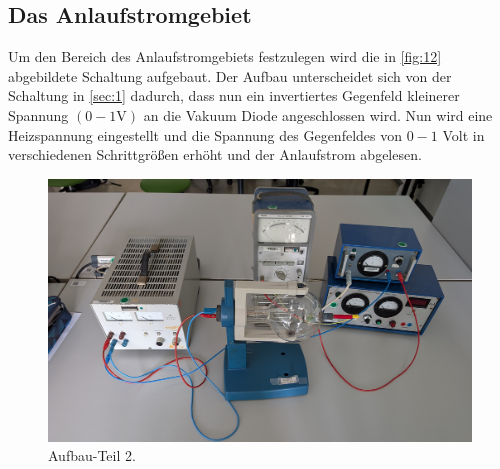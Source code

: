 \subsection{Das Anlaufstromgebiet}
Um den Bereich des Anlaufstromgebiets festzulegen wird die in \autoref{fig:12}
abgebildete Schaltung aufgebaut. Der Aufbau unterscheidet sich von der Schaltung
in \autoref{sec:1} dadurch, dass nun ein invertiertes Gegenfeld kleinerer Spannung
$\left(0 - 1 \unit{\volt}\right)$ an die Vakuum Diode angeschlossen wird.
Nun wird eine Heizspannung eingestellt und die Spannung des Gegenfeldes
von $0-1$ Volt in verschiedenen Schrittgrößen erhöht und der Anlaufstrom
abgelesen.
\begin{figure}[H]
    \centering
        \centering
        \includegraphics[width=\textwidth]{Bilder/1.jpg}
        \caption{Aufbau-Teil 2.}
    \hfill
    \label{fig:12}
\end{figure}